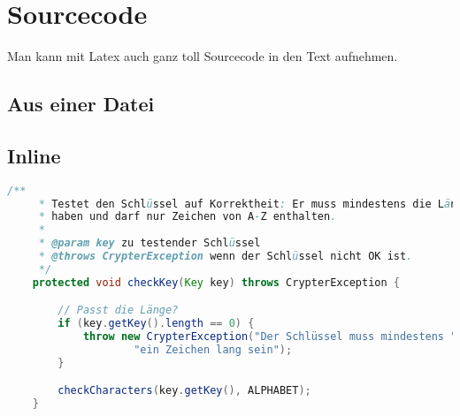 \section{Sourcecode}

Man kann mit Latex auch ganz toll Sourcecode in den Text aufnehmen.

\subsection{Aus einer Datei}




\subsection{Inline}

\begin{lstlisting}[language=Java,caption=Methode checkKey()]
    /**
     * Testet den Schlüssel auf Korrektheit: Er muss mindestens die Länge 1
     * haben und darf nur Zeichen von A-Z enthalten.
     *
     * @param key zu testender Schlüssel
     * @throws CrypterException wenn der Schlüssel nicht OK ist.
     */
    protected void checkKey(Key key) throws CrypterException {

        // Passt die Länge?
        if (key.getKey().length == 0) {
            throw new CrypterException("Der Schlüssel muss mindestens " +
                    "ein Zeichen lang sein");
        }

        checkCharacters(key.getKey(), ALPHABET);
    }
\end{lstlisting}

